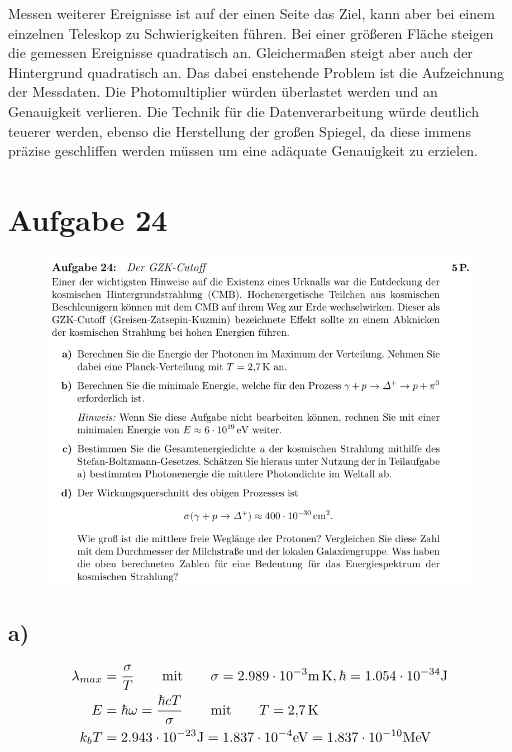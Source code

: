     \justifying Messen weiterer Ereignisse ist auf der einen Seite das Ziel, kann aber bei einem einzelnen Teleskop zu Schwierigkeiten
    führen. Bei einer größeren Fläche steigen die gemessen Ereignisse quadratisch an. Gleichermaßen steigt aber auch der Hintergrund quadratisch an. 
    Das dabei enstehende Problem ist die Aufzeichnung der Messdaten. Die Photomultiplier würden überlastet werden und an Genauigkeit verlieren. Die
    Technik für die Datenverarbeitung würde deutlich teuerer werden, ebenso die Herstellung der großen Spiegel, da diese immens präzise geschliffen werden 
    müssen um eine adäquate Genauigkeit zu erzielen. 

\section{Aufgabe 24}

    \begin{figure}[H]
        \centering
        \includegraphics[width=\textwidth]{images/Aufgabe24.jpg}
        \label{fig:5}
    \end{figure}

\subsection{a)}

    \begin{align}
        \lambda_{max} &= \frac{\sigma}{T} \qquad \text{mit} \qquad \sigma = \text{$2.989\cdot 10^{-3}$\SI{}{\meter\kelvin}}, \hbar = \text{$1.054\cdot 10^{-34}$\SI{}{\joule}}\\
        E &= \hbar \omega = \frac{\hbar c T}{\sigma} \qquad \text{mit} \qquad T = \text{\SI{2.7}{\kelvin}}\\
        k_b T &= 2.943\cdot 10^{-23}\text{\SI{}{\joule}} = 1.837\cdot 10^{-4}\text{\SI{}{\electronvolt}} = 1.837\cdot 10^{-10}\text{\SI{}{\mega\electronvolt}}
    \end{align}

